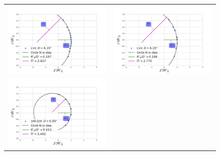\begin{figure}
\begin{tabular}{cc}
    \includegraphics[clip]{./Programs/LV-bowshocks-xyfancy-positionswill-LV4} &                                                                            \includegraphics[clip]{./Programs/Multi-Fit/samp01/LV-bowshocks-xyfancy-positionssamp01-LV4} \\
    \includegraphics[clip]{./Programs/LV-bowshocks-xyfancy-positionswill-168-328} &

\end{tabular}
\end{figure}
